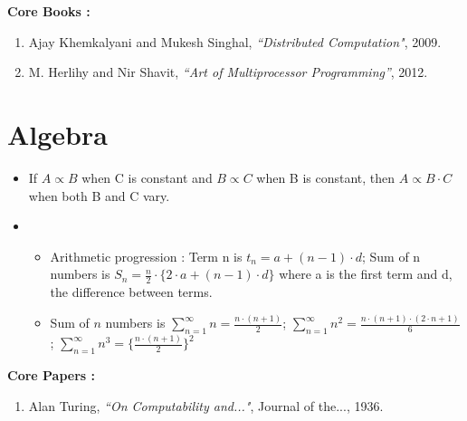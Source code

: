 \documentclass[10pt]{article}
\begin{document}
\vspace{0.35 in}
{\Large \textbf{Core Books :}}
\vspace{0.2 in}
\begin{enumerate}
\item Ajay Khemkalyani and Mukesh Singhal, \textit{``Distributed Computation"},  2009.
\item M. Herlihy and Nir Shavit, \textit{``Art of Multiprocessor Programming''}, 2012.
\end{enumerate}
 
 \section{Algebra }
 \begin{itemize}
 \item If $A \propto B$ when C is constant and $B \propto C$ when B is constant, then $A \propto B \cdot C$ when both B and C vary.
 \item 
 \begin{itemize}
 \item Arithmetic progression : Term n is $t_n = a + (n-1) \cdot d$; Sum of n numbers is $S_n = \frac {n}{2} \cdot \{2 \cdot a + (n-1) \cdot d\}$ where a is the first term and d, the difference between terms.
 \item Sum of $n$ numbers is $\sum_{n=1}^{\infty}n = \frac{n \cdot (n+1)}{2}$; $\sum_{n=1}^{\infty}n^2 = \frac{n \cdot (n+1) \cdot (2 \cdot n +1)}{6}$; $\sum_{n=1}^{\infty}n^3 = \{\frac{n \cdot (n+1)}{2}\}^2$
 \end{itemize}
 \end{itemize}  

\vspace{0.35 in}
{\Large \textbf{Core Papers :}}
\vspace{0.2 in}
\begin{enumerate}

\item Alan Turing,  \textit{``On Computability and..."}, Journal of the..., 1936.

\end{enumerate}
\end{document}
